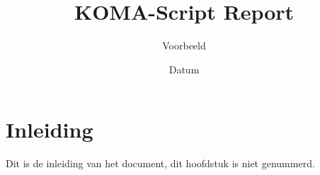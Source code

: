\documentclass[
    fontsize=10pt,
    twoside=semi,
    usegeometry,
    autoenlargeheadfoot=false,
    toc=bibliography,
    open=any
]{scrreprt}
\title{KOMA-Script Report}
\subtitle{Voorbeeld}
\date{Datum}
\begin{document}
    \maketitle
    \tableofcontents

    \chapter*{Inleiding}
    Dit is de inleiding van het document, dit hoofdstuk is niet genummerd.
    \clearpage

    

    \printbibliography
\end{document}
